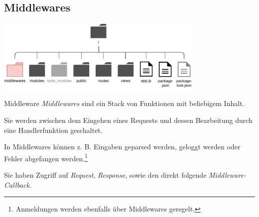 \subsection{Middlewares}

\begin{center}
    \includegraphics[width=0.75\textwidth]{includes/figures/bonus_nodejs_middlewares.pdf}
\end{center}

\begin{defi}{Middleware}
    \emph{Middlewares} sind ein Stack von Funktionen mit beliebigem Inhalt.

    Sie werden zwischen dem Eingehen eines Requests und dessen Bearbeitung durch eine Handlerfunktion geschaltet.

    In Middlewares können z. B. Eingaben geparsed werden, geloggt werden oder Fehler abgefangen werden.\footnote{Anmeldungen werden ebenfalls über Middlewares geregelt.}

    Sie haben Zugriff auf \emph{Request}, \emph{Response}, sowie den direkt folgende \emph{Middleware-Callback}.
\end{defi}

